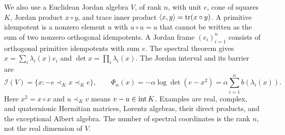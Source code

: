 We also use a Euclidean Jordan algebra $V$, of rank $n$, with unit $e$,
cone of squares $K$, Jordan product $x\circ y$, and trace inner product
$\langle x,y\rangle=\operatorname{tr}(x\circ y)$. A primitive idempotent is a nonzero element
$u$ with $u\circ u=u$ that cannot be written as the sum of two nonzero
orthogonal idempotents. A Jordan frame $(e_i)_{i=1}^n$ consists of
orthogonal primitive idempotents with sum $e$. The spectral theorem gives
$x=\sum_i\lambda_i(x)e_i$ and $\det x=\prod_i\lambda_i(x)$.
The Jordan interval and its barrier are
\begin{equation}
 \mathcal I(V)=\{x:-e\prec_Kx\prec_Ke\},\qquad
 \Phi_\alpha(x)=-\alpha\log\det(e-x^2)
 =\alpha\sum_{i=1}^n b(\lambda_i(x)).
 \label{eq:jordan-interval}
\end{equation}
Here $x^2=x\circ x$ and $u\prec_Kv$ means $v-u\in\operatorname{int} K$.
Examples are real, complex, and quaternionic Hermitian matrices,
Lorentz algebras, their direct products, and the exceptional Albert
algebra. The number of spectral coordinates is the rank $n$, not the
real dimension of $V$.

